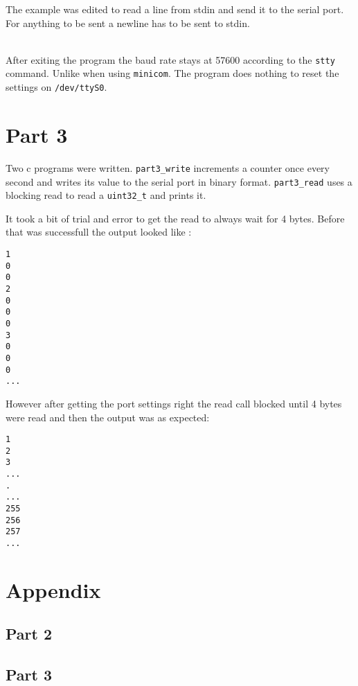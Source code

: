 \documentclass{article}
\begin{document}
The example was edited to read a line from stdin and send it to the serial port. For anything to be sent a newline has to be sent to stdin.

\\
After exiting the program the baud rate stays at 57600 according to the \verb"stty" command. Unlike when using \verb"minicom". The program does nothing to reset the settings on \verb"/dev/ttyS0".



\section*{Part 3}
Two c programs were written. \verb!part3_write! increments a counter once every second and writes its value to the serial port in binary format. \verb!part3_read! uses a blocking read to read a \verb!uint32_t! and prints it.

It took a bit of trial and error to get the read to always wait for 4 bytes. Before that was successfull the output looked like :
\begin{verbatim}
1
0
0
2
0
0
0
3
0
0
0
...
\end{verbatim}
 
 However after getting the port settings right the read call blocked until 4 bytes were read and then the output was as expected:
 \begin{verbatim}
1
2
3
...
.
...
255
256
257
...
 \end{verbatim}

\section*{Appendix}
\appendix
\subsection*{Part 2}\label{appendix:part2}
%
\subsection*{Part 3}\label{appendix:part3}
%
%
\end{document}
